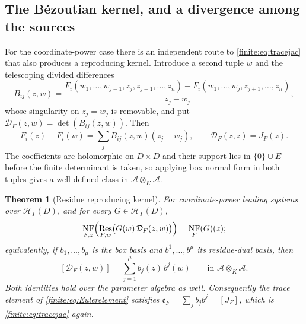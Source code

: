 \documentclass[11pt,letterpaper]{article}
\newtheorem{theorem}{Theorem}[section]
\theoremstyle{definition}
\theoremstyle{remark}
\newcommand{\HH}{\mathscr H}
\newcommand{\Alg}{\mathcal A}
\newcommand{\Eul}{\mathfrak e}
\DeclareMathOperator{\NF}{NF}
\DeclareMathOperator{\Res}{Res}
\numberwithin{equation}{section}
\begin{document}
\subsection{The B\'ezoutian kernel, and a divergence among the sources}
\label{finite:sec:bezout}

For the coordinate-power case there is an independent route to \eqref{finite:eq:tracejac} that also produces a reproducing kernel. Introduce a second tuple $w$ and the telescoping divided differences
\begin{equation}\label{finite:eq:bezentries}
 B_{ij}(z,w)=
 \frac{F_i(w_1,\ldots,w_{j-1},z_j,z_{j+1},\ldots,z_n)
      -F_i(w_1,\ldots,w_j,z_{j+1},\ldots,z_n)}{z_j-w_j},
\end{equation}
whose singularity on $z_j=w_j$ is removable, and put $\mathcal D_F(z,w)=\det(B_{ij}(z,w))$. Then
\begin{equation}\label{finite:eq:bezrelation}
 F_i(z)-F_i(w)=\sum_jB_{ij}(z,w)(z_j-w_j),
 \qquad \mathcal D_F(z,z)=J_F(z).
\end{equation}
The coefficients are holomorphic on $D\times D$ and their support lies in $\{0\}\cup E$ before the finite determinant is taken, so applying box normal form in both tuples gives a well-defined class in $\Alg\otimes_K\Alg$.

\begin{theorem}[Residue reproducing kernel]
\label{finite:thm:bezout}
For coordinate-power leading systems over $\HH_\Gamma(D)$, and for every $G\in\HH_\Gamma(D)$,
\begin{equation}\label{finite:eq:reproduce}
 \NF_{F,z}\Bigl(\Res_{F,w}\bigl(G(w)\,\mathcal D_F(z,w)\bigr)\Bigr)=\NF_F(G)(z);
\end{equation}
equivalently, if $b_1,\ldots,b_\mu$ is the box basis and $b^1,\ldots,b^\mu$ its residue-dual basis, then
\begin{equation}\label{finite:eq:casimir}
 [\mathcal D_F(z,w)]=\sum_{j=1}^{\mu}b_j(z)\,b^j(w)
 \qquad\text{in }\Alg\otimes_K\Alg .
\end{equation}
Both identities hold over the parameter algebra as well. Consequently the trace element of \eqref{finite:eq:Eulerelement} satisfies $\Eul_F=\sum_jb_jb^j=[J_F]$, which is \eqref{finite:eq:tracejac} again.
\end{theorem}
\end{document}
